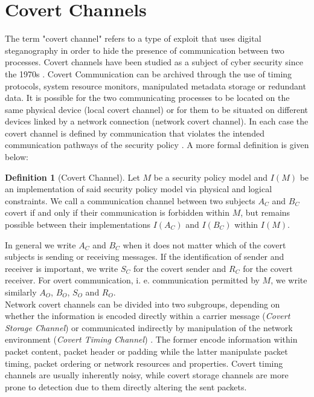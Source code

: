 \documentclass[12pt,a4paper,automark, toc=bib]{scrreprt}
\theoremstyle{definition}
\newtheorem{definition}{Definition}[chapter]
\begin{document}
		\section{Covert Channels}
			The term "covert channel" refers to a type of exploit that uses digital steganography in order to hide the presence of communication between two processes. Covert channels have been studied as a subject of cyber security since the 1970s  \cite{Lampson1973}. Covert Communication can be archived through the use of timing protocols, system resource monitors, manipulated metadata storage or redundant data. It is possible for the two communicating processes to be located on the same physical device (local covert channel) or for them to be situated on different devices linked by a network connection (network covert channel). In each case the covert channel is defined by communication that violates the intended communication pathways of the security policy \cite{TCSEC}. A more formal definition is given below:
			\begin{definition}[Covert Channel]		 \cite{Tsai1987, Gligor1994}
				Let $M$ be a security policy model and $I(M)$ be an implementation of said security policy model via physical and logical constraints. We call a communication channel between two subjects $A_C$ and $B_C$ covert if and only if their communication is forbidden within $M$, but remains possible between their implementations $I(A_C)$ and $I(B_C)$ within $I(M)$.
			\end{definition}
			In general we write $A_C$ and $B_C$ when it does not matter which of the covert subjects is sending or receiving messages. If the identification of sender and receiver is important, we  write $S_C$ for the covert sender and $R_C$ for the covert receiver. For overt communication, i. e. communication permitted by $M$, we write similarly $A_O$, $B_O$, $S_O$ and $R_O$.\\
			Network covert channels can be divided into two subgroups, depending on whether the information is encoded directly within a carrier message (\textit{Covert Storage Channel}) or communicated indirectly by manipulation of the network environment (\textit{Covert Timing Channel}) \cite{Wendzel2015}. The former encode information within packet content, packet header or padding while the latter manipulate packet timing, packet ordering or network resources and properties. Covert timing channels are usually inherently noisy, while covert storage channels are more prone to detection due to them directly altering the sent packets.
\end{document}
